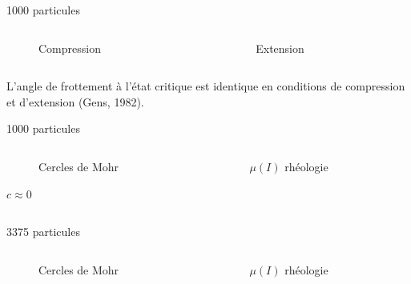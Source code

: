 \documentclass[10pt]{beamer}
\begin{document}
\begin{frame}{1000 particules}
    \begin{columns}
        \begin{column}{0.5\textwidth}
            \begin{figure}
                \centering
                \scalebox{0.5}{}
                \caption{Compression}
            \end{figure}
        \end{column}
        \begin{column}{0.5\textwidth}
            \begin{figure}
                \centering
                \scalebox{0.5}{}
                \caption{Extension}
            \end{figure}
        \end{column}
    \end{columns}
    L’angle de frottement à l’état critique est identique en conditions de compression et d’extension (Gens, 1982).
\end{frame}

\begin{frame}{1000 particules}
    \begin{columns}
        \begin{column}{0.5\textwidth}
            \begin{figure}
                \centering
                \scalebox{0.4}{}
                \caption{Cercles de Mohr}
            \end{figure}

            $c \approx 0$
        \end{column}
        \begin{column}{0.5\textwidth}
            \begin{figure}
                \centering
                \scalebox{0.5}{}
                \caption{$\mu(I)$ rhéologie}
            \end{figure}
        \end{column}
    \end{columns}
\end{frame}

\begin{frame}{3375 particules}
    \begin{columns}
        \begin{column}{0.5\textwidth}
            \begin{figure}[h]
                \centering
                \scalebox{0.4}{}
                \caption{Cercles de Mohr}
            \end{figure}
        \end{column}
        \begin{column}{0.5\textwidth}
            \begin{figure}[h]
                \centering
                \scalebox{0.5}{}
                \caption{$\mu(I)$ rhéologie}
            \end{figure}
        \end{column}
    \end{columns}
\end{frame}
\end{document}
